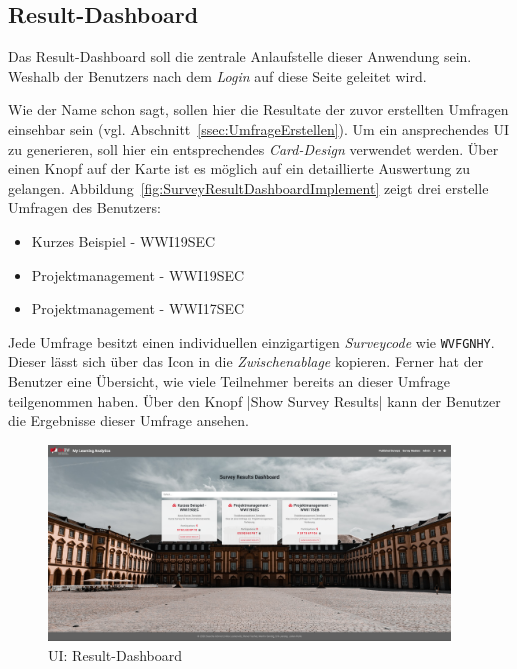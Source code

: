 
\subsection{Result-Dashboard}
\label{ssec:ResultDashboardImplement}

Das Result-Dashboard soll die zentrale Anlaufstelle dieser Anwendung sein.
Weshalb der Benutzers nach dem \emph{Login} auf diese Seite geleitet wird.

Wie der Name schon sagt, sollen hier die Resultate der zuvor erstellten Umfragen einsehbar sein (vgl. Abschnitt~\vref{ssec:UmfrageErstellen}).
Um ein ansprechendes \ac{UI} zu generieren, soll hier ein entsprechendes \emph{Card-Design} verwendet werden.
Über einen Knopf auf der Karte ist es möglich auf ein detaillierte Auswertung zu gelangen. \newline
Abbildung~\vref{fig:SurveyResultDashboardImplement} zeigt drei erstelle Umfragen des Benutzers:
%
\begin{itemize}
	\item Kurzes Beispiel - WWI19SEC
	\item Projektmanagement - WWI19SEC
	\item Projektmanagement - WWI17SEC
\end{itemize}
%
Jede Umfrage besitzt einen individuellen einzigartigen \emph{Surveycode} wie \zb \texttt{W\-V\-F\-G\-N\-H\-Y}.
Dieser lässt sich über das Icon \faClipboard\xspace in die \emph{Zwischenablage} kopieren.
Ferner hat der Benutzer eine Übersicht, wie viele Teilnehmer  bereits an dieser Umfrage teilgenommen haben.
Über den Knopf \jinline|Show Survey Results| kann der Benutzer die Ergebnisse dieser Umfrage ansehen.

\begin{figure}[!htb]
	\centering
	\includegraphics[width=0.95\textwidth, keepaspectratio]{img/client/SurveyResultDashboard.png}
	\captionsetup{justification=centering, format=plain}
	\caption[\acl{UI}: Result-Dashboard]{\acl{UI}: Result-Dashboard \\ \quelleScreenshot}
	\label{fig:SurveyResultDashboardImplement}
\end{figure}

